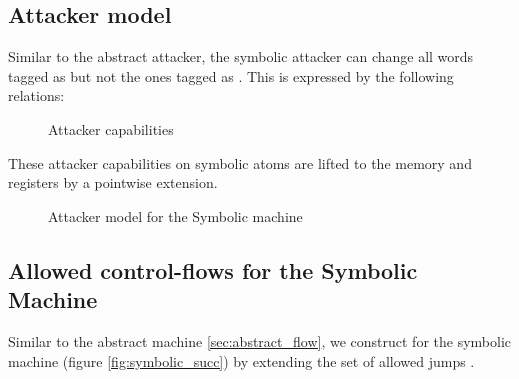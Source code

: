 \subsection{Attacker model}\label{sec:symbolic_attacker}

Similar to the abstract attacker, the symbolic attacker can change all words
tagged as \DATAname but not the ones tagged as \INSTRname. This is expressed by
the following relations:

\begin{figure}[htbp]
\bigskip
{}
\caption{Attacker capabilities}
\label{fig:symbolic_attacker_atom}
\end{figure}

These attacker capabilities on symbolic atoms are lifted to
the memory and registers by a pointwise extension.

\begin{figure}[htbp]
\caption{Attacker model for the Symbolic machine}
\label{fig:symbolic_attacker}
\end{figure}

\subsection{Allowed control-flows for the Symbolic Machine}
\label{sec:symbolic_flow}

Similar to the abstract machine \ref{sec:abstract_flow}, we construct
 for the symbolic machine (figure \ref{fig:symbolic_succ}) by
extending the set of allowed jumps \CFG.

